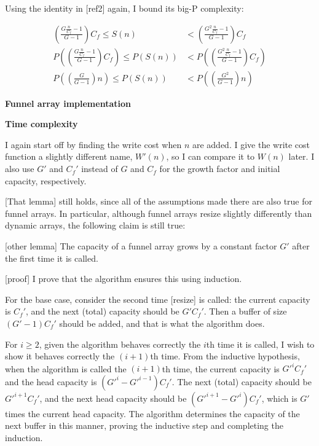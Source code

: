 \documentclass{article}
\newcommand{\funarrayimpl}{\textbf{Funnel array implementation}}
\newcommand{\tcomplex}{\textbf{Time complexity}}
\newcommand{\spacefn}{S}
\newcommand{\nwritesfn}{W}
\newcommand{\nwritesnewfn}{\nwritesfn'}
\newcommand{\biggo}{P}
\newcommand{\varnitems}{n}
\newcommand{\initcapacity}{C_f}
\newcommand{\growthfactor}{G}
\newcommand{\initcapacitynew}{\initcapacity'}
\newcommand{\growthfactornew}{\growthfactor'}
\begin{document}
	Using the identity in [ref2] again, I bound its big-P complexity:
	
	\begin{align*}
	\left( \frac{\growthfactor \frac{\varnitems}{\initcapacity} - 1}{\growthfactor - 1} \right) \initcapacity \leq \spacefn(\varnitems) &< \left( \frac{\growthfactor^2 \frac{\varnitems}{\initcapacity} - 1}{\growthfactor - 1} \right) \initcapacity\\
	\biggo\left( \left( \frac{\growthfactor \frac{\varnitems}{\initcapacity} - 1}{\growthfactor - 1} \right) \initcapacity \right) \leq \biggo\left( \spacefn(\varnitems) \right) &< \biggo\left( \left( \frac{\growthfactor^2 \frac{\varnitems}{\initcapacity} - 1}{\growthfactor - 1} \right) \initcapacity \right)\\
	\biggo\left( \left( \frac{\growthfactor}{\growthfactor - 1} \right) \varnitems \right) \leq \biggo\left( \spacefn(\varnitems) \right) &< \biggo\left( \left( \frac{\growthfactor^2}{\growthfactor - 1} \right) \varnitems \right)
	\end{align*}
	
	\funarrayimpl
	
	\tcomplex
	
	I again start off by finding the write cost when $\varnitems$ are added. I give the write cost function a slightly different name, $\nwritesnewfn(\varnitems)$, so I can compare it to $\nwritesfn(\varnitems)$ later. I also use $\growthfactornew$ and $\initcapacitynew$ instead of $\growthfactor$ and $\initcapacity$ for the growth factor and initial capacity, respectively.
	
	[That lemma] still holds, since all of the assumptions made there are also true for funnel arrays. In particular, although funnel arrays resize slightly differently than dynamic arrays, the following claim is still true:
	
	[other lemma]
	The capacity of a funnel array grows by a constant factor $\growthfactornew$ after the first time it is called.
	
	[proof]
	I prove that the algorithm ensures this using induction.
	
	For the base case, consider the second time [resize] is called: the current capacity is $\initcapacitynew$, and the next (total) capacity should be $\growthfactornew\initcapacitynew$. Then a buffer of size $(\growthfactornew - 1)\initcapacitynew$ should be added, and that is what the algorithm does.
	
	For $i \geq 2$, given the algorithm behaves correctly the $i$th time it is called, I wish to show it behaves correctly the $(i + 1)$th time. From the inductive hypothesis, when the algorithm is called the $(i + 1)$th time, the current capacity is $\growthfactornew^i\initcapacitynew$ and the head capacity is $(\growthfactornew^i - \growthfactornew^{i - 1})\initcapacitynew$. The next (total) capacity should be $\growthfactornew^{i + 1}\initcapacitynew$, and the next head capacity should be $(\growthfactornew^{i + 1} - \growthfactornew^i)\initcapacitynew$, which is $\growthfactornew$ times the current head capacity. The algorithm determines the capacity of the next buffer in this manner, proving the inductive step and completing the induction.
	
\end{document}
